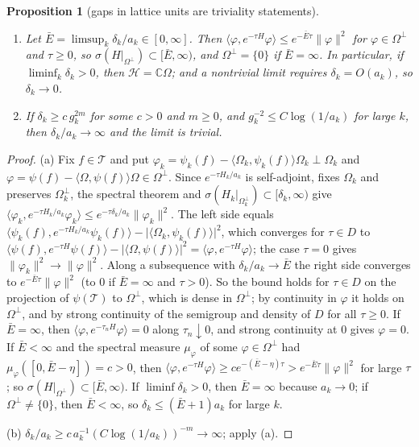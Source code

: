 \documentclass[11pt,a4paper]{amsart}
\newtheorem{proposition}[theorem]{Proposition}
\theoremstyle{definition}
\theoremstyle{remark}
\numberwithin{equation}{section}
\newcommand{\C}{\mathbb{C}}          %
\newcommand{\Hilb}{\mathcal{H}}      %
\newcommand{\ip}[2]{\langle #1,#2\rangle}  %
\newcommand{\norm}[1]{\lVert #1\rVert}     %
\newcommand{\abs}[1]{\lvert #1\rvert}      %
\begin{document}
\begin{proposition}[gaps in lattice units are triviality statements]\label{prop:lattice-unit-triviality}
\leavevmode
\begin{enumerate}[label=\textup{(\alph*)},leftmargin=*]
\item Let $\bar E=\limsup_k\delta_k/a_k\in[0,\infty]$. Then $\ip\varphi{e^{-\tau H}\varphi}\le e^{-\bar E\tau}\norm\varphi^2$ for $\varphi\in\Omega^\perp$ and $\tau\ge0$, so $\sigma(H|_{\Omega^\perp})\subset[\bar E,\infty)$, and $\Omega^\perp=\{0\}$ if $\bar E=\infty$. In particular, if $\liminf_k\delta_k>0$, then $\Hilb=\C\Omega$; and a nontrivial limit requires $\delta_k=O(a_k)$, so $\delta_k\to0$.
\item If $\delta_k\ge c\,g_k^{2m}$ for some $c>0$ and $m\ge0$, and $g_k^{-2}\le C\log(1/a_k)$ for large $k$, then $\delta_k/a_k\to\infty$ and the limit is trivial.
\end{enumerate}
\end{proposition}

\begin{proof}
(a) Fix $f\in\mathcal T$ and put $\varphi_k=\psi_k(f)-\ip{\Omega_k}{\psi_k(f)}\Omega_k\perp\Omega_k$ and $\varphi=\psi(f)-\ip\Omega{\psi(f)}\Omega\in\Omega^\perp$. Since $e^{-\tau H_k/a_k}$ is self-adjoint, fixes $\Omega_k$ and preserves $\Omega_k^\perp$, the spectral theorem and $\sigma(H_k|_{\Omega_k^\perp})\subset[\delta_k,\infty)$ give $\ip{\varphi_k}{e^{-\tau H_k/a_k}\varphi_k}\le e^{-\tau\delta_k/a_k}\norm{\varphi_k}^2$. The left side equals $\ip{\psi_k(f)}{e^{-\tau H_k/a_k}\psi_k(f)}-\abs{\ip{\Omega_k}{\psi_k(f)}}^2$, which converges for $\tau\in D$ to $\ip{\psi(f)}{e^{-\tau H}\psi(f)}-\abs{\ip\Omega{\psi(f)}}^2=\ip\varphi{e^{-\tau H}\varphi}$; the case $\tau=0$ gives $\norm{\varphi_k}^2\to\norm\varphi^2$. Along a subsequence with $\delta_k/a_k\to\bar E$ the right side converges to $e^{-\bar E\tau}\norm\varphi^2$ (to $0$ if $\bar E=\infty$ and $\tau>0$). So the bound holds for $\tau\in D$ on the projection of $\psi(\mathcal T)$ to $\Omega^\perp$, which is dense in $\Omega^\perp$; by continuity in $\varphi$ it holds on $\Omega^\perp$, and by strong continuity of the semigroup and density of $D$ for all $\tau\ge0$. If $\bar E=\infty$, then $\ip\varphi{e^{-\tau_nH}\varphi}=0$ along $\tau_n\downarrow0$, and strong continuity at $0$ gives $\varphi=0$. If $\bar E<\infty$ and the spectral measure $\mu_\varphi$ of some $\varphi\in\Omega^\perp$ had $\mu_\varphi([0,\bar E-\eta])=c>0$, then $\ip\varphi{e^{-\tau H}\varphi}\ge ce^{-(\bar E-\eta)\tau}>e^{-\bar E\tau}\norm\varphi^2$ for large $\tau$; so $\sigma(H|_{\Omega^\perp})\subset[\bar E,\infty)$. If $\liminf\delta_k>0$, then $\bar E=\infty$ because $a_k\to0$; if $\Omega^\perp\ne\{0\}$, then $\bar E<\infty$, so $\delta_k\le(\bar E+1)a_k$ for large $k$.

(b) $\delta_k/a_k\ge c\,a_k^{-1}(C\log(1/a_k))^{-m}\to\infty$; apply (a).
\end{proof}
\end{document}
